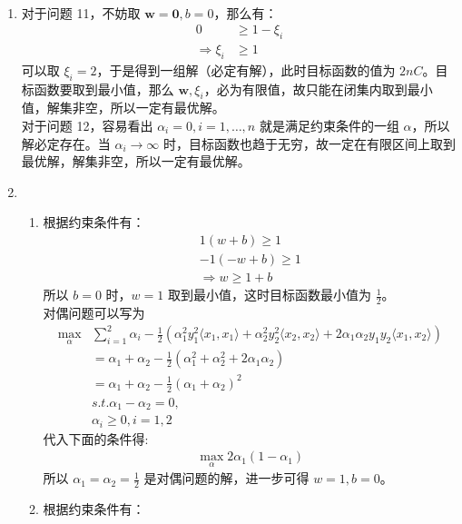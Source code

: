 \documentclass[11pt,letter,notitlepage]{article}
\begin{document}
\begin{solution}
	\heiti
	\ \\
	\begin{enumerate}
		\item 对于问题 11，不妨取 $\mathbf{w} = \mathbf{0}, b = 0$，那么有：
		\begin{align*}
			0 &\geqslant 1 - \xi_i\\
			\Rightarrow \xi_i &\geqslant 1
		\end{align*}
		可以取 $\xi_i = 2$，于是得到一组解（必定有解），此时目标函数的值为 $2nC$。目标函数要取到最小值，那么 $\mathbf{w}, \xi_i$，必为有限值，故只能在闭集内取到最小值，解集非空，所以一定有最优解。\\
		对于问题 12，容易看出 $\alpha_i = 0, i= 1,\dots, n$ 就是满足约束条件的一组 $\alpha$，所以解必定存在。当 $\alpha_i \rightarrow \infty$ 时，目标函数也趋于无穷，故一定在有限区间上取到最优解，解集非空，所以一定有最优解。
		\item \ \\
		\begin{enumerate}
			\item 根据约束条件有：
			\begin{align*}
				1(w+b) \geqslant 1\\
				-1(-w + b) \geqslant 1\\
				\Rightarrow w \geqslant 1 + b
			\end{align*}
			所以 $b = 0$ 时，$w = 1$ 取到最小值，这时目标函数最小值为 $\frac{1}{2}$。\\
			对偶问题可以写为
			\begin{align*}
				\max_{\alpha} &\sum\limits_{i=1}^{2} \alpha_i - \frac{1}{2}(\alpha_1^2y_1^2\langle x_1, x_1 \rangle + \alpha_2^2y_2^2\langle x_2, x_2 \rangle +2\alpha_1\alpha_2y_1y_2\langle x_1, x_2 \rangle)\\
				&= \alpha_1 + \alpha_2 - \frac{1}{2}(\alpha_1^2 + \alpha_2^2 + 2\alpha_1\alpha_2)\\
				&= \alpha_1 + \alpha_2 - \frac{1}{2} (\alpha_1 + \alpha_2)^2\\
				&s.t. \alpha_1-\alpha_2 = 0,\\
				&\alpha_i \geqslant 0, i= 1, 2
			\end{align*}
			代入下面的条件得:
			\begin{align*}
				\max_{\alpha} 2\alpha_1(1-\alpha_1)
			\end{align*}
			所以 $\alpha_1 = \alpha_2 = \frac{1}{2}$ 是对偶问题的解，进一步可得 $w = 1, b = 0$。
			\item 根据约束条件有：

\end{enumerate}
\end{enumerate}
\end{solution}
\end{document}
